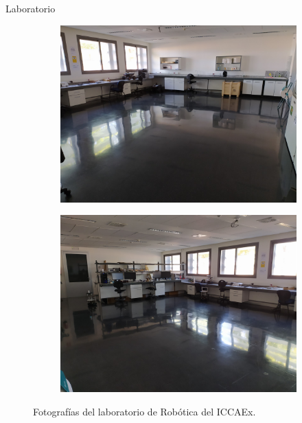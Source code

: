 \documentclass{beamer}
\begin{document}
  \begin{frame}{Laboratorio}
    \begin{figure}[H]
      \begin{subfigure}[b]{.45\textwidth}
        \centering
        \includegraphics[width=\textwidth]{pic/lab1.jpg}
        \label{fig:foto_lab1}
      \end{subfigure}
      \begin{subfigure}[b]{.45\textwidth}
        \centering
        \includegraphics[width=\textwidth]{pic/lab2.jpg}
        \label{fig:foto_lab2}
      \end{subfigure}
      \caption{Fotografías del laboratorio de Robótica del ICCAEx.}
      \label{fig:foto_lab}
    \end{figure}
  \end{frame}
\end{document}
